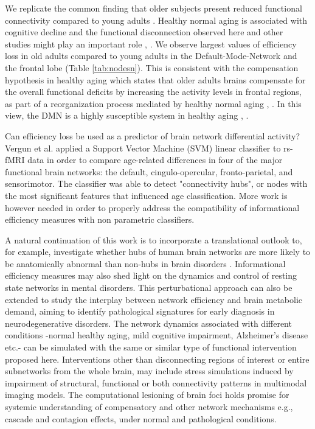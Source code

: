 \documentclass[12pt,a4paper]{article}
\begin{document}
We replicate the common finding that older subjects present reduced functional connectivity compared to young adults \citep{sala-llonch_changes_2014}. Healthy normal aging is associated with cognitive decline and the functional disconnection observed here and other studies might play an important role \citep{ferreira_resting-state_2013}, \citep{dennis_functional_2014}.  
We observe largest values of efficiency loss in old adults compared to young adults in the Default-Mode-Network and the frontal lobe (Table \ref{tab:nodesn}).
This is consistent with the compensation hypothesis in healthy aging which states that older adults brains compensate for the overall functional deficits by increasing the activity levels in frontal regions, as part of a reorganization process mediated by healthy normal aging \citep{cabeza_aging_2002}, \citep{park_adaptive_2009}. In this view, the DMN is a highly susceptible system in healthy aging \citep{betzel_changes_2014}, \citep{onoda_decreased_2012}. 

Can efficiency loss be used as a predictor of brain network differential activity? 
Vergun et al. \citep{vergun_characterizing_2013} applied a Support Vector Machine (SVM) linear classifier to rs-fMRI data in order to compare age-related differences in four of the major functional brain networks: the default, cingulo-opercular, fronto-parietal, and sensorimotor. 
The classifier was able to detect "connectivity hubs", or nodes with the most significant features that influenced age classification. More work is however needed in order to properly address the compatibility of informational efficiency measures with non parametric classifiers. 

A natural continuation of this work is to incorporate a translational outlook to, for example, investigate whether hubs of human brain networks are more likely to be anatomically abnormal than non-hubs in brain disorders \citep{crossley_hubs_2014}. Informational efficiency measures may also shed light on the dynamics and control of resting state networks in mental disorders. 
This perturbational approach can also be extended to study the interplay between network efficiency and brain metabolic demand, aiming to identify pathological signatures for early diagnosis in neurodegenerative disorders. The network dynamics associated with different conditions -normal healthy aging, mild cognitive impairment, Alzheimer's disease etc.- can be simulated with the same or similar type of functional intervention proposed here. Interventions other than disconnecting regions of interest or entire subnetworks from the whole brain, may include stress simulations induced by impairment of structural, functional or both connectivity patterns in multimodal imaging models. The computational lesioning of brain foci holds promise for systemic understanding of compensatory and other network mechanisms e.g., cascade and contagion effects, under normal and pathological conditions.   


%

\end{document}
